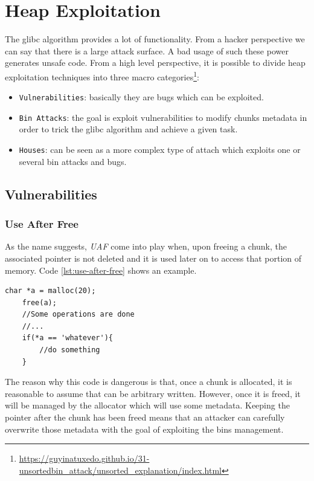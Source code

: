 \documentclass{article}
\numberwithin{equation}{subsection}
\begin{document}
\section{Heap Exploitation}
The glibc algorithm provides a lot of functionality. From a hacker perspective we can say that there is a large attack surface. A bad usage of such these power generates unsafe code. From a high level perspective, it is possible to divide heap exploitation techniques into three macro categories\footnote{\href{https://guyinatuxedo.github.io/31-unsortedbin_attack/unsorted_explanation/index.html}{https://guyinatuxedo.github.io/31-unsortedbin\_attack/unsorted\_explanation/index.html}}:
\begin{itemize}
    \item \texttt{Vulnerabilities}: basically they are bugs which can be exploited.
    \item \texttt{Bin Attacks}: the goal is exploit vulnerabilities to modify chunks metadata in order to trick the glibc algorithm and achieve a given task.
    \item \texttt{Houses}: can be seen as a more complex type of attach which exploits one or several bin attacks and bugs.
\end{itemize}
\clearpage
\subsection{Vulnerabilities}
\subsubsection{Use After Free}
As the name suggests, \emph{UAF} come into play when, upon freeing a chunk, the associated pointer is not deleted and it is used later on to access that portion of memory. Code \ref{lst:use-after-free} shows an example.\newline

\begin{minipage}{\textwidth}
\centering
    \lstset{style=cstyle}
    \begin{lstlisting}[caption={Use After Free vulnerable code.},captionpos=b,label={lst:use-after-free}]
    char *a = malloc(20);
    free(a);
    //Some operations are done
    //...
    if(*a == 'whatever'){
        //do something
    }
\end{lstlisting}
\end{minipage}
\noindent
The reason why this code is dangerous is that, once a chunk is allocated, it is reasonable to assume that can be arbitrary written. However, once it is freed, it will be managed by the allocator which will use some metadata. Keeping the pointer after the chunk has been freed means that an attacker can carefully overwrite those metadata with the goal of exploiting the bins management.
\end{document}
